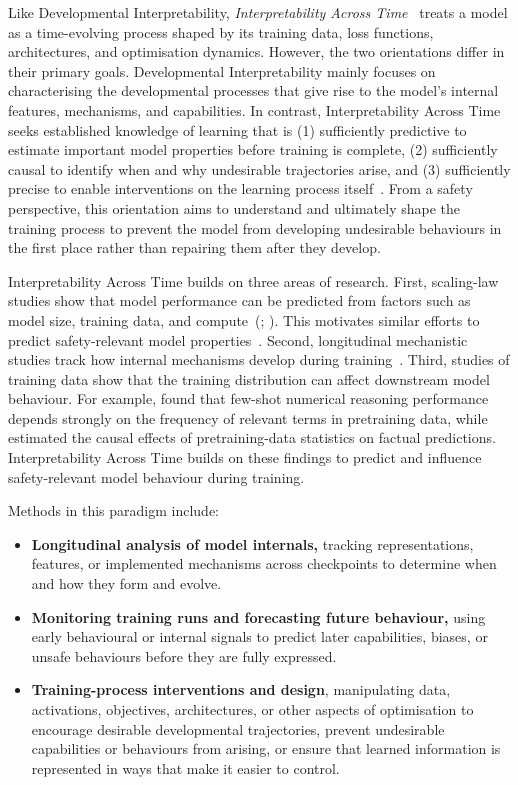 Like Developmental Interpretability, \emph{Interpretability Across Time}~ treats a model as a time-evolving process shaped by its training data, loss functions, architectures, and optimisation dynamics. However, the two orientations differ in their primary goals. Developmental Interpretability mainly focuses on characterising the developmental processes that give rise to the model's internal features, mechanisms, and capabilities. In contrast, Interpretability Across Time seeks established knowledge of learning that is (1) sufficiently predictive to estimate important model properties before training is complete, (2) sufficiently causal to identify when and why undesirable trajectories arise, and (3) sufficiently precise to enable interventions on the learning process itself~. From a safety perspective, this orientation aims to understand and ultimately shape the training process to prevent the model from developing undesirable behaviours in the first place rather than repairing them after they develop.

Interpretability Across Time builds on three areas of research. First, scaling-law studies show that model performance can be predicted from factors such as model size, training data, and compute~(; ). This motivates similar efforts to predict safety-relevant model properties~. Second, longitudinal mechanistic studies track how internal mechanisms develop during training~. Third, studies of training data show that the training distribution can affect downstream model behaviour. For example,  found that few-shot numerical reasoning performance depends strongly on the frequency of relevant terms in pretraining data, while  estimated the causal effects of pretraining-data statistics on factual predictions. Interpretability Across Time builds on these findings to predict and influence safety-relevant model behaviour during training.

Methods in this paradigm include:
\begin{itemize}
\item \textbf{Longitudinal analysis of model internals,} tracking representations, features, or implemented mechanisms across checkpoints to determine when and how they form and evolve.
\item \textbf{Monitoring training runs and forecasting future behaviour,} using early behavioural or internal signals to predict later capabilities, biases, or unsafe behaviours before they are fully expressed.
\item \textbf{Training-process interventions and design}, manipulating data, activations, objectives, architectures, or other aspects of optimisation to encourage desirable developmental trajectories, prevent undesirable capabilities or behaviours from arising, or ensure that learned information is represented in ways that make it easier to control.
\end{itemize}

